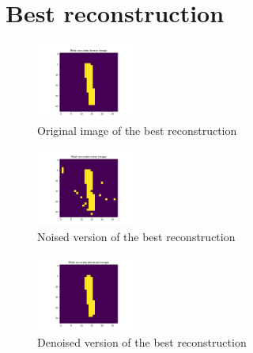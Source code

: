 \documentclass[a4paper]{article}
\begin{document}
\section{Best reconstruction}
\begin{figure}[H]
\centering
\includegraphics[width=0.3\textwidth]{most_accurate_binary_image.png}
\caption{\label{fig:data}Original image of the best reconstruction}
\end{figure}
\begin{figure}[H]
\centering
\includegraphics[width=0.3\textwidth]{most_accurate_noisy_image.png}
\caption{\label{fig:data}Noised version of the best reconstruction}
\end{figure}
\begin{figure}[H]
\centering
\includegraphics[width=0.3\textwidth]{most_accurate_denoised_image.png}
\caption{\label{fig:data}Denoised version of the best reconstruction}
\end{figure}
\end{document}
